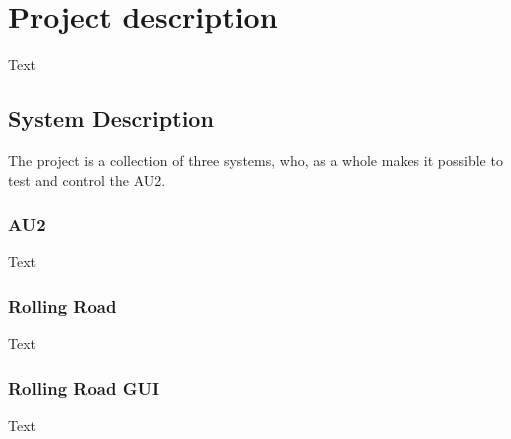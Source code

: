 \chapter{Project description}
Text

\section{System Description}

The project is a collection of three systems, who, as a whole makes it possible to test and control the AU2.

\subsection{AU2}
Text

\subsection{Rolling Road}
Text

\subsection{Rolling Road GUI}
Text